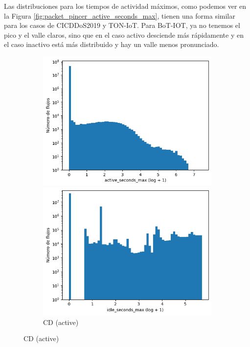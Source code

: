 Las distribuciones para los tiempos de actividad máximos, como podemos ver en la Figura \ref{fig:packet_pincer_active_seconds_max}, tienen una forma similar para los casos de CICDDoS2019 y TON-IoT. Para BoT-IOT, ya no tenemos el pico y el valle claros, sino que en el caso activo desciende más rápidamente y en el caso inactivo está más distribuido y hay un valle menos pronunciado.

\begin{figure}[H]
    \centering
    \begin{subfigure}[b]{0.26\textwidth}
        \centering
        \includegraphics[width=\textwidth]{media/packet_pincer_cicddos/active_seconds_max_log_x_log_y.png}
        \caption{CD (active)}
        \includegraphics[width=\textwidth]{media/packet_pincer_cicddos/idle_seconds_max_log_x_log_y.png}

\end{subfigure}
\end{figure}
